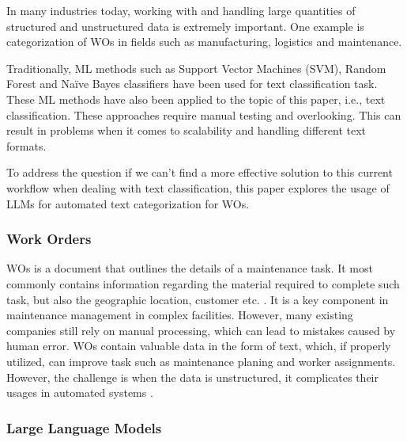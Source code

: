 \documentclass{article}
\begin{document}
In many industries today, working with and handling large quantities of structured and unstructured data is extremely
important. One example is categorization of WOs in fields such as manufacturing, logistics and maintenance.

Traditionally, ML methods such as Support Vector Machines (SVM), Random Forest and Naïve Bayes classifiers
have been used for text classification task. These ML methods have also been applied to the topic of
this paper, i.e., text classification. These approaches require manual testing and overlooking.
This can result in problems when it comes to scalability and handling different text formats.

To address the question if we can't find a more effective solution to this current workflow
when dealing with text classification, this paper explores the usage of LLMs for automated
text categorization for WOs.

\subsubsection{Work Orders}

WOs is a document that outlines the details of a maintenance task.
It most commonly contains information regarding the material required to complete such task,
but also the geographic location, customer etc. \cite{ibm2023}.
It is a key component in maintenance management in complex facilities.
However, many existing companies still rely on manual processing,
which can lead to mistakes caused by human error.
WOs contain valuable data in the form of text, which, if properly utilized,
can improve task such as maintenance planing and worker assignments.
However, the challenge is when the data is unstructured,
it complicates their usages in automated systems \cite{li2023}.

\subsubsection{Large Language Models}
\end{document}
